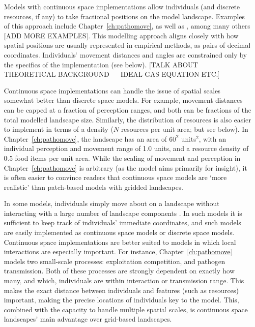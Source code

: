 Models with continuous space implementations allow individuals (and discrete resources, if any) to take fractional positions on the model landscape.
Examples of this approach include Chapter~\ref{ch:pathomove}, as well as \citet{spiegel2016,spiegel2017}, among many others [ADD MORE EXAMPLES].
This modelling approach aligns closely with how spatial positions are usually represented in empirical methods, as pairs of decimal coordinates.
Individuals' movement distances and angles are constrained only by the specifics of the implementation (see below).
[TALK ABOUT THEORETICAL BACKGROUND --- IDEAL GAS EQUATION ETC.]

Continuous space implementations can handle the issue of spatial scales somewhat better than discrete space models.
For example, movement distances can be capped at a fraction of perception ranges, and both can be fractions of the total modelled landscape size.
Similarly, the distribution of resources is also easier to implement in terms of a density ($N$ resources per unit area; but see below).
In Chapter~\ref{ch:pathomove}, the landscape has an area of $60^2$ units$^2$, with an individual perception and movement range of 1.0 units, and a resource density of 0.5 food items per unit area.
While the scaling of movement and perception in Chapter~\ref{ch:pathomove} is arbitrary (as the model aims primarily for insight), it is often easier to convince readers that continuous space models are `more realistic' than patch-based models with gridded landscapes.

In some models, individuals simply move about on a landscape without interacting with a large number of landscape components \citep[see some models in][]{spiegel2017}.
In such models it is sufficient to keep track of individuals' immediate coordinates, and such models are easily implemented as continuous space models or discrete space models.
Continuous space implementations are better suited to models in which local interactions are especially important.
For instance, Chapter~\ref{ch:pathomove} models two small-scale processes: exploitation competition, and pathogen transmission.
Both of these processes are strongly dependent on exactly how many, and which, individuals are within interaction or transmission range.
This makes the exact distance between individuals and features (such as resources) important, making the precise locations of individuals key to the model.
This, combined with the capacity to handle multiple spatial scales, is continuous space landscapes' main advantage over grid-based landscapes.

